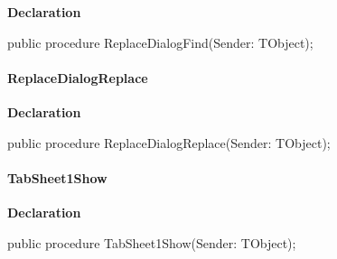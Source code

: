 \documentclass{report}
\newif\ifpdf
\begin{document}
\label{editor.TFrmEditor-ReplaceDialogFind}
\begin{list}{}{
\setlength{\itemindent}{0cm}
\setlength{\listparindent}{0cm}
\setlength{\leftmargin}{\evensidemargin}
\addtolength{\leftmargin}{\tmplength}
\settowidth{\labelsep}{X}
\addtolength{\leftmargin}{\labelsep}
\setlength{\labelwidth}{\tmplength}
}
\item[\textbf{Declaration}\hfill]
\ifpdf
\begin{flushleft}
\fi
\begin{ttfamily}
public procedure ReplaceDialogFind(Sender: TObject);\end{ttfamily}

\ifpdf
\end{flushleft}
\fi

\end{list}
\paragraph*{ReplaceDialogReplace}\hspace*{\fill}

\label{editor.TFrmEditor-ReplaceDialogReplace}
\begin{list}{}{
\setlength{\itemindent}{0cm}
\setlength{\listparindent}{0cm}
\setlength{\leftmargin}{\evensidemargin}
\addtolength{\leftmargin}{\tmplength}
\settowidth{\labelsep}{X}
\addtolength{\leftmargin}{\labelsep}
\setlength{\labelwidth}{\tmplength}
}
\item[\textbf{Declaration}\hfill]
\ifpdf
\begin{flushleft}
\fi
\begin{ttfamily}
public procedure ReplaceDialogReplace(Sender: TObject);\end{ttfamily}

\ifpdf
\end{flushleft}
\fi

\end{list}
\paragraph*{TabSheet1Show}\hspace*{\fill}

\label{editor.TFrmEditor-TabSheet1Show}
\begin{list}{}{
\setlength{\itemindent}{0cm}
\setlength{\listparindent}{0cm}
\setlength{\leftmargin}{\evensidemargin}
\addtolength{\leftmargin}{\tmplength}
\settowidth{\labelsep}{X}
\addtolength{\leftmargin}{\labelsep}
\setlength{\labelwidth}{\tmplength}
}
\item[\textbf{Declaration}\hfill]
\ifpdf
\begin{flushleft}
\fi
\begin{ttfamily}
public procedure TabSheet1Show(Sender: TObject);\end{ttfamily}

\ifpdf
\end{flushleft}
\fi

\end{list}
\end{document}
